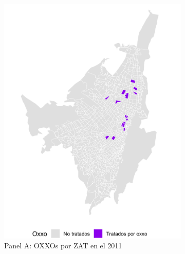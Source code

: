 \documentclass{article}
\begin{document}
\begin{figure} [H]
    \centering
    \begin{subfigure}[b]{0.4\textwidth} %
        \includegraphics[width=\linewidth]{figs_oxxo_maps/mapa_oxxos_binary_2011.png}
        \caption{Panel A: OXXOs por ZAT en el 2011}
        \label{fig:panelA}
    \end{subfigure}
    \hfill
    \begin{subfigure}[b]{0.4\textwidth} %

\end{subfigure}
\end{figure}
\end{document}
